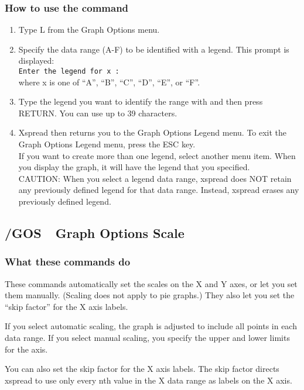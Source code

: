 \subsubsection*{How to use the command}
\begin{enumerate}
\item{Type L from the Graph Options menu.}
\item{Specify the data range (A-F) to be identified with a legend.  This
prompt is displayed:\\
{\tt Enter the legend for x :}\\
where x is one of ``A'', ``B'', ``C'', ``D'', ``E'', or ``F''.}
\item{Type the legend you want to identify the range with and then press
RETURN.  You can use up to 39 characters.}
\item{Xspread then returns you to the Graph Options Legend menu.  To
exit the Graph Options Legend menu, press the ESC key.\\
        If you want to create more than one legend, select another menu item.
When you display the graph, it will have the legend that you 
specified.\\
CAUTION:  When you select a legend data range, xspread does NOT retain 
any previously defined legend for that data range.  Instead, xspread 
erases any previously defined legend.}
\end{enumerate}

\subsection*{/GOS\ \     Graph Options Scale}

\subsubsection*{What these commands do}
These commands automatically set the scales on the X and Y axes, or 
let you set them manually.  (Scaling does not apply to pie graphs.)  
They also let you set the ``skip factor'' for the X axis labels.

If you select automatic scaling, the graph is adjusted to include all 
points in each data range.  If you select manual scaling, you specify 
the upper and lower limits for the axis.

You can also set the skip factor for the X axis labels.  The skip 
factor directs xspread to use only every nth value in the X data range 
as labels on the X axis.

